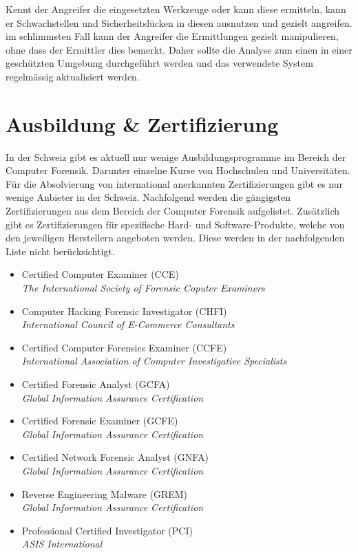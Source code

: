 Kennt der Angreifer die eingesetzten Werkzeuge oder kann diese ermitteln, kann er Schwachstellen und Sicherheitslücken in diesen ausnutzen und gezielt angreifen. im schlimmsten Fall kann der Angreifer die Ermittlungen gezielt manipulieren, ohne dass der Ermittler dies bemerkt. Daher sollte die Analyse zum einen in einer geschützten Umgebung durchgeführt werden und das verwendete System regelmässig aktualisiert werden.



\section{Ausbildung \& Zertifizierung}
In der Schweiz gibt es aktuell nur wenige Ausbildungsprogramme im Bereich der Computer Forensik. Darunter einzelne Kurse von Hochschulen und Universitäten. Für die Absolvierung von international anerkannten Zertifizierungen gibt es nur wenige Anbieter in der Schweiz. Nachfolgend werden die gängigsten Zertifizierungen aus dem Bereich der Computer Forensik aufgelistet. Zusätzlich gibt es Zertifizierungen für spezifische Hard- und Software-Produkte, welche von den jeweiligen Herstellern angeboten werden. Diese werden in der nachfolgenden Liste nicht berücksichtigt.

\begin{itemize}
\item Certified Computer Examiner (CCE) \\
\textit{The International Society of Forensic Coputer Examiners}

\item Computer Hacking Forensic Investigator (CHFI) \\
\textit{International Council of E-Commerce Consultants}

\item Certified Computer Forensics Examiner (CCFE) \\
\textit{International Association of Computer Investigative Specialists}

\item Certified Forensic Analyst (GCFA)\\
\textit{Global Information Assurance Certification}
\item Certified Forensic Examiner (GCFE)\\
\textit{Global Information Assurance Certification}
\item Certified Network Forensic Analyst (GNFA)\\
\textit{Global Information Assurance Certification}
\item Reverse Engineering Malware (GREM)\\
\textit{Global Information Assurance Certification}

\item Professional Certified Investigator (PCI)\\
\textit{ASIS International}
\end{itemize}


